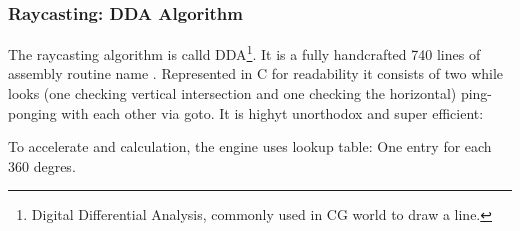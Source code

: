 













 
 
 
 
 
 
 
 
\subsubsection{Raycasting: DDA Algorithm}
The raycasting algorithm is calld DDA\footnote{Digital Differential Analysis, commonly used in CG world to draw a line.}. It is a fully handcrafted 740 lines of assembly routine name . Represented in C for readability it consists of two while looks (one checking vertical intersection and one checking the horizontal) ping-ponging with each other via goto. It is highyt unorthodox and super efficient:\\
\par

\begin{minipage}{\textwidth}

\end{minipage}

 To accelerate  and  calculation, the engine uses lookup table: One entry for each 360 degres.




